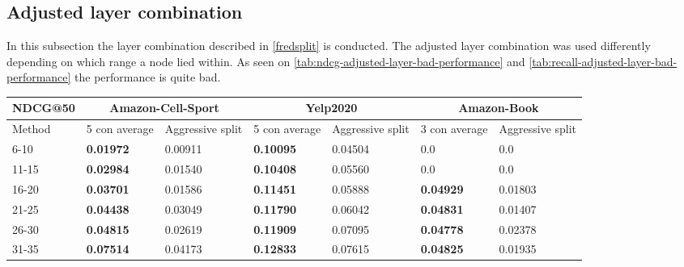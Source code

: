\subsection{Adjusted layer combination}\label{app:adjusted-layer-combi}
In this subsection the layer combination described in \autoref{fredsplit} is conducted.
The adjusted layer combination was used differently depending on which range a node lied within.
As seen on \autoref{tab:ndcg-adjusted-layer-bad-performance} and \autoref{tab:recall-adjusted-layer-bad-performance} the performance is quite bad.
\begin{table*}[h!]
    \centering
    \begin{tabular}{|l|l|l||l|l||l|l|}
        \hline
        NDCG@50   & \multicolumn{2}{c||}{Amazon-Cell-Sport} & \multicolumn{2}{c||}{Yelp2020} & \multicolumn{2}{c|}{Amazon-Book}                                                          \\ \hline
        Method    & 5 con average                           & Aggressive split               & 5 con average                    & Aggressive split & 3 con average    & Aggressive split \\ \hline
        6-10      & \textbf{0.01972}                        & 0.00911                        & \textbf{0.10095}                 & 0.04504          & 0.0              & 0.0              \\ \hline
        11-15     & \textbf{0.02984}                        & 0.01540                        & \textbf{0.10408}                 & 0.05560          & 0.0              & 0.0              \\ \hline
        16-20     & \textbf{0.03701}                        & 0.01586                        & \textbf{0.11451}                 & 0.05888          & \textbf{0.04929} & 0.01803          \\ \hline
        21-25     & \textbf{0.04438}                        & 0.03049                        & \textbf{0.11790}                 & 0.06042          & \textbf{0.04831} & 0.01407          \\ \hline
        26-30     & \textbf{0.04815}                        & 0.02619                        & \textbf{0.11909}                 & 0.07095          & \textbf{0.04778} & 0.02378          \\ \hline
        31-35     & \textbf{0.07514}                        & 0.04173                        & \textbf{0.12833}                 & 0.07615          & \textbf{0.04825} & 0.01935          \\ \hline

\end{tabular}
\end{table*}
